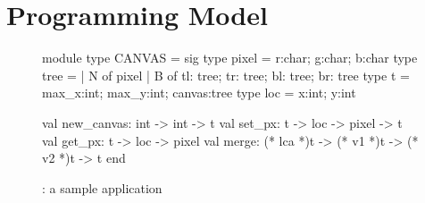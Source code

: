 \section{Programming Model}
\label{sec:model}

\begin{figure}
\begin{center}
  \begin{ocaml}
  module type CANVAS = sig
    type pixel = {r:char; g:char; b:char}
    type tree =
      | N of pixel
      | B of {tl: tree; tr: tree; bl: tree; br: tree}
    type t = {max_x:int; max_y:int; canvas:tree}
    type loc = {x:int; y:int}

    val new_canvas: int -> int -> t
    val set_px: t -> loc -> pixel -> t
    val get_px: t -> loc -> pixel
    val merge: (* lca *)t -> (* v1 *)t -> (* v2 *)t -> t
  end
  \end{ocaml}
\end{center}
\caption{\drawsome: a sample \name application}
\label{fig:canvas-sig}
\end{figure}

